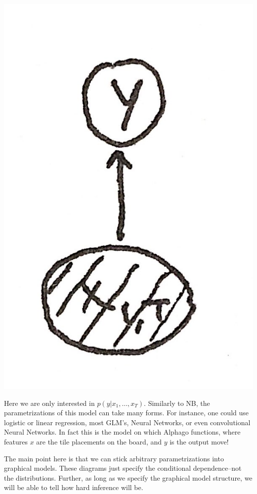 \documentclass{article}
\begin{document}
\begin{center}
\includegraphics[scale=.1]{conditional_diagrams}
\end{center}
Here we are only interested in $p(y|x_1,\ldots,x_T)$. Similarly to NB, the parametrizations of this model can take many forms. For instance, one could use logistic or linear regression, most GLM's, Neural Networks, or even convolutional Neural Networks. In fact this is the model on which Alphago functions, where features $x$ are the tile placements on the board, and $y$ is the output move!

The main point here is that we can stick arbitrary parametrizations into graphical models. These diagrams just specify the conditional dependence--not the distributions. Further, as long as we specify the graphical model structure, we will be able to tell how hard inference will be.
\end{document}
